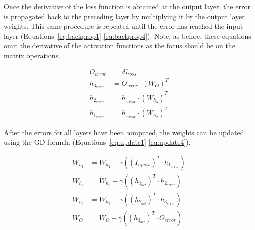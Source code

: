 Once the derivative of the loss function is obtained at the output layer, the
error is propagated back to the preceding layer by multiplying it by the output
layer weights. This same procedure is repeated until the error has reached the
input layer (Equations~\ref{eq:backprop1}-\ref{eq:backprop4}). Note: as before,
these equations omit the derivative of the activation functions as the focus
should be on the matrix operations. 

\begin{align}
    O_{\textit{error}} &= dL_\textit{oss} \label{eq:backprop1}\\
        h_{3_{\textit{error}}} &= O_{\textit{error}} \cdot (W_{O})^T \label{eq:backprop2}\\
        h_{2_{\textit{error}}} &= h_{3_{\textit{error}}} \cdot (W_{h_3})^T \label{eq:backprop3}\\
        h_{1_{\textit{error}}} &= h_{2_{\textit{error}}} \cdot (W_{h_2})^T \label{eq:backprop4}
\end{align}

After the errors for all layers have been computed, the weights can be updated
using the GD formula (Equations~\ref{eq:update1}-\ref{eq:update4}).

\begin{align}
    W_{h_1} &= W_{h_1} - \gamma ((I_\textit{nputs})^T \cdot h_{1_{\textit{error}}}) \label{eq:update1} \\
    W_{h_2} &= W_{h_2} - \gamma ((h_{1_{\textit{act}}})^T \cdot h_{2_{\textit{error}}}) \label{eq:update2} \\
    W_{h_3} &= W_{h_3} - \gamma ((h_{2_{\textit{act}}})^T \cdot h_{3_{\textit{error}}}) \label{eq:update3} \\
    W_{O} &= W_{O} - \gamma ((h_{3_{\textit{act}}})^T \cdot O_{\textit{error}}) \label{eq:update4}
\end{align}
